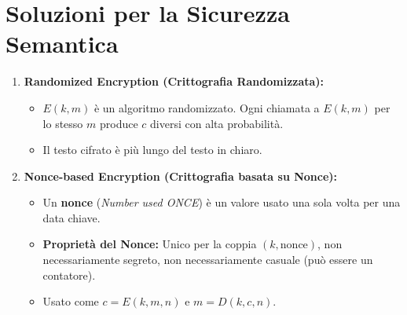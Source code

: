 \documentclass{article}
\begin{document}
\section{Soluzioni per la Sicurezza Semantica}
\begin{enumerate}
    \item \textbf{Randomized Encryption (Crittografia Randomizzata):}
    \begin{itemize}
        \item $E(k,m)$ è un algoritmo randomizzato. Ogni chiamata a $E(k,m)$ per lo stesso $m$ produce $c$ diversi con alta probabilità.
        \item Il testo cifrato è più lungo del testo in chiaro.
    \end{itemize}
    \item \textbf{Nonce-based Encryption (Crittografia basata su Nonce):}
    \begin{itemize}
        \item Un \textbf{nonce} (\textit{Number used ONCE}) è un valore usato una sola volta per una data chiave.
        \item \textbf{Proprietà del Nonce:} Unico per la coppia $(k, \text{nonce})$, non necessariamente segreto, non necessariamente casuale (può essere un contatore).
        \item Usato come $c = E(k, m, n)$ e $m = D(k, c, n)$.
    \end{itemize}
\end{enumerate}
\end{document}
